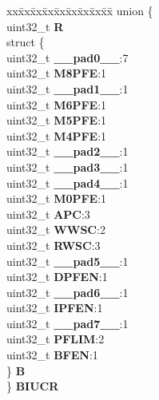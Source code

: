 \begin{DoxyCompactItemize}
\begin{tabbing}
\end{tabbing}\item 
\mbox{\label{structFLASH__tag_a49de829555c59383c05cc98a349b98e9}} 
\begin{tabbing}
xx\=xx\=xx\=xx\=xx\=xx\=xx\=xx\=xx\=\kill
union \{\\
\>uint32\_t {\bfseries R}\\
\>struct \{\\
\>\>uint32\_t {\bfseries \_\_pad0\_\_}:7\\
\>\>uint32\_t {\bfseries M8PFE}:1\\
\>\>uint32\_t {\bfseries \_\_pad1\_\_}:1\\
\>\>uint32\_t {\bfseries M6PFE}:1\\
\>\>uint32\_t {\bfseries M5PFE}:1\\
\>\>uint32\_t {\bfseries M4PFE}:1\\
\>\>uint32\_t {\bfseries \_\_pad2\_\_}:1\\
\>\>uint32\_t {\bfseries \_\_pad3\_\_}:1\\
\>\>uint32\_t {\bfseries \_\_pad4\_\_}:1\\
\>\>uint32\_t {\bfseries M0PFE}:1\\
\>\>uint32\_t {\bfseries APC}:3\\
\>\>uint32\_t {\bfseries WWSC}:2\\
\>\>uint32\_t {\bfseries RWSC}:3\\
\>\>uint32\_t {\bfseries \_\_pad5\_\_}:1\\
\>\>uint32\_t {\bfseries DPFEN}:1\\
\>\>uint32\_t {\bfseries \_\_pad6\_\_}:1\\
\>\>uint32\_t {\bfseries IPFEN}:1\\
\>\>uint32\_t {\bfseries \_\_pad7\_\_}:1\\
\>\>uint32\_t {\bfseries PFLIM}:2\\
\>\>uint32\_t {\bfseries BFEN}:1\\
\>\} {\bfseries B}\\
\} {\bfseries BIUCR}\\


\end{tabbing}
\end{DoxyCompactItemize}
